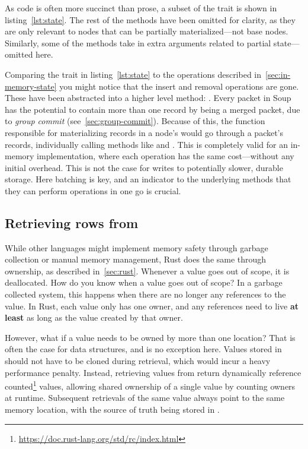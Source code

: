 As code is often more succinct than prose, a subset of the  trait is
shown in listing~\ref{lst:state}. The rest of the methods have been omitted for
clarity, as they are only relevant to nodes that can be partially
materialized---not base nodes. Similarly, some of the methods take in extra
arguments related to partial state---omitted here.

Comparing the trait in listing~\ref{lst:state} to the operations described
in~\ref{sec:in-memory-state} you might notice that the insert and removal
operations are gone. These have been abstracted into a higher level method:
. Every packet in Soup has the potential to contain more
than one record by being a merged packet, due to \textit{group commit}
(see~\ref{sec:group-commit}). Because of this, the function responsible for
materializing records in a node's  would go through a packet's
records, individually calling methods like  and
. This is completely valid for an in-memory implementation,
where each operation has the same cost---without any initial overhead. This is
not the case for writes to potentially slower, durable storage. Here batching is
key, and an indicator to the underlying methods that they can perform operations
in one go is crucial.

\subsection{Retrieving rows from }
While other languages might implement memory safety through garbage collection
or manual memory management, Rust does the same through ownership, as described
in~\ref{sec:rust}. Whenever a value goes out of scope, it is deallocated. How
do you know when a value goes out of scope? In a garbage collected system, this
happens when there are no longer any references to the value. In Rust, each
value only has one owner, and any references need to live \textbf{at least} as
long as the value created by that owner.

However, what if a value needs to be owned by more than one location? That is
often the case for data structures, and  is no exception here.
Values stored in  should not have to be cloned during
retrieval, which would incur a heavy performance penalty. Instead, retrieving
values from  return dynamically reference
counted\footnote{\url{https://doc.rust-lang.org/std/rc/index.html}} values,
allowing shared ownership of a single value by counting owners at runtime.
Subsequent retrievals of the same value always point to the same memory
location, with the source of truth being stored in .

